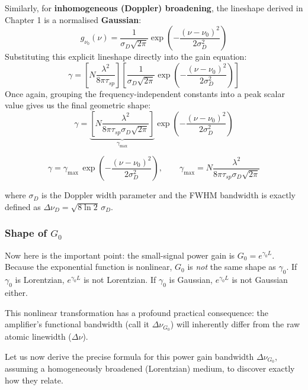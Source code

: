 Similarly, for \textbf{inhomogeneous (Doppler) broadening}, the lineshape derived in Chapter 1 is a normalised \textbf{Gaussian}:
\begin{equation*}
    g_{\nu_0}(\nu) = \frac{1}{\sigma_D \sqrt{2\pi}} \exp\!\left(-\frac{(\nu-\nu_0)^2}{2\sigma_D^2}\right)
\end{equation*}
Substituting this explicit lineshape directly into the gain equation:
\begin{equation*}
    \gamma = \left[ N \frac{\lambda^2}{8\pi\tau_{sp}} \right] \left[ \frac{1}{\sigma_D \sqrt{2\pi}} \exp\!\left(-\frac{(\nu-\nu_0)^2}{2\sigma_D^2}\right) \right]
\end{equation*}
Once again, grouping the frequency-independent constants into a peak scalar value gives us the final geometric shape:
\begin{equation*}
    \gamma = \underbrace{\left[ N \frac{\lambda^2}{8\pi\tau_{sp}\sigma_D\sqrt{2\pi}} \right]}_{\gamma_{\max}} \exp\!\left(-\frac{(\nu-\nu_0)^2}{2\sigma_D^2}\right)
\end{equation*}
\begin{keyresult}
    \begin{equation}
        \gamma = \gamma_{\max}\,\exp\!\left(-\frac{(\nu-\nu_0)^2}{2\sigma_D^2}\right), \qquad \gamma_{\max} = N \frac{\lambda^2}{8\pi\tau_{sp}\sigma_D\sqrt{2\pi}}
    \end{equation}
\end{keyresult}
where $\sigma_D$ is the Doppler width parameter and the FWHM bandwidth is exactly defined as $\Delta\nu_D = \sqrt{8\ln 2}\,\sigma_D$.

\subsubsection*{Shape of \texorpdfstring{$G_0$}{G\_0}}

Now here is the important point: the small-signal power gain is $G_0 = e^{\gamma_0 L}$. Because the exponential function is nonlinear, $G_0$ is \emph{not} the same shape as $\gamma_0$. If $\gamma_0$ is Lorentzian, $e^{\gamma_0 L}$ is not Lorentzian. If $\gamma_0$ is Gaussian, $e^{\gamma_0 L}$ is not Gaussian either.

This nonlinear transformation has a profound practical consequence: the amplifier's functional bandwidth (call it $\Delta\nu_{G_0}$) will inherently differ from the raw atomic linewidth ($\Delta\nu$).

Let us now derive the precise formula for this power gain bandwidth $\Delta\nu_{G_0}$, assuming a homogeneously broadened (Lorentzian) medium, to discover exactly how they relate.

